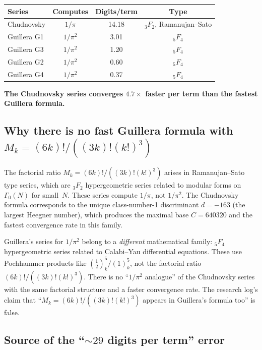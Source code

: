 \documentclass[11pt]{article}
\begin{document}
\begin{center}
\begin{tabular}{lccc}
\toprule
\textbf{Series} & \textbf{Computes} & \textbf{Digits/term} & \textbf{Type} \\
\midrule
Chudnovsky & $1/\pi$ & 14.18 & ${}_3F_2$, Ramanujan--Sato \\
Guillera G1 & $1/\pi^2$ & 3.01 & ${}_5F_4$ \\
Guillera G3 & $1/\pi^2$ & 1.20 & ${}_5F_4$ \\
Guillera G2 & $1/\pi^2$ & 0.60 & ${}_5F_4$ \\
Guillera G4 & $1/\pi^2$ & 0.37 & ${}_5F_4$ \\
\bottomrule
\end{tabular}
\end{center}

\textbf{The Chudnovsky series converges $4.7\times$ faster per term than the fastest Guillera formula.}

\subsection{Why there is no fast Guillera formula with $M_k = (6k)!/((3k)!(k!)^3)$}

The factorial ratio $M_k = (6k)!/((3k)!(k!)^3)$ arises in Ramanujan--Sato type series, which are ${}_3F_2$ hypergeometric series related to modular forms on $\Gamma_0(N)$ for small~$N$. These series compute $1/\pi$, not $1/\pi^2$. The Chudnovsky formula corresponds to the unique class-number-1 discriminant $d = -163$ (the largest Heegner number), which produces the maximal base $C = 640320$ and the fastest convergence rate in this family.

Guillera's series for $1/\pi^2$ belong to a \emph{different} mathematical family: ${}_5F_4$ hypergeometric series related to Calabi--Yau differential equations. These use Pochhammer products like $(\tfrac{1}{2})_k^5 / (1)_k^5$, not the factorial ratio $(6k)!/((3k)!(k!)^3)$. There is no ``$1/\pi^2$ analogue'' of the Chudnovsky series with the same factorial structure and a faster convergence rate. The research log's claim that ``$M_k = (6k)!/((3k)!(k!)^3)$ appears in Guillera's formula too'' is false.

\subsection{Source of the ``${\sim}29$ digits per term'' error}
\end{document}
